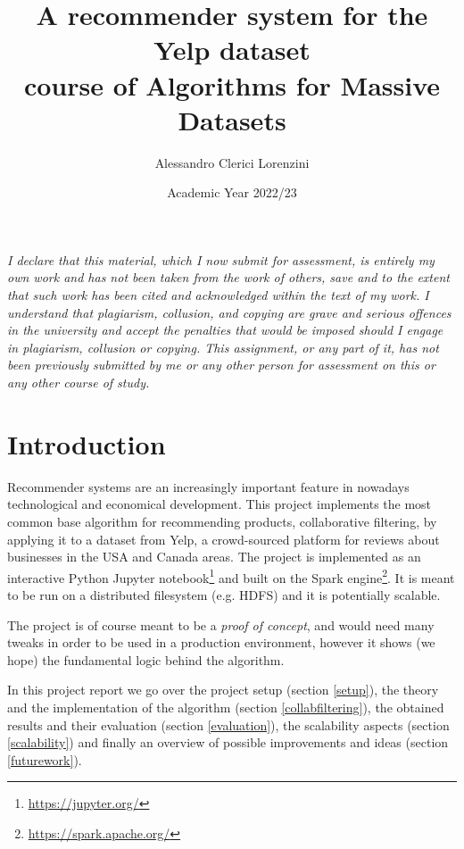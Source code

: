 \documentclass[11pt,a4paper]{article}
\title{A recommender system for the Yelp dataset\\
{\small course of Algorithms for Massive Datasets}}
\author{Alessandro Clerici Lorenzini}
\date{Academic Year 2022/23}
\begin{document}
\maketitle

\begin{multicols}{2}


\textit{I declare that this material, which I now submit for assessment, is entirely my own work and has not been taken from the work of others, save and to the extent that such work has been cited and acknowledged within the text of my work. I understand that plagiarism, collusion, and copying are grave and serious offences in the university and accept the penalties that would be imposed should I engage in plagiarism, collusion or copying. This assignment, or any part of it, has not been previously submitted by me or any other person for assessment on this or any other course of study.}



\section{Introduction}
Recommender systems are an increasingly important feature in nowadays technological and economical development.
This project implements the most common base algorithm for recommending products, collaborative filtering, by applying it to a dataset from Yelp, a crowd-sourced platform for reviews about businesses in the USA and Canada areas.
The project is implemented as an interactive Python Jupyter notebook\footnote{\url{https://jupyter.org/}} and built on the Spark engine\footnote{\url{https://spark.apache.org/}}.
It is meant to be run on a distributed filesystem (e.g. HDFS) and it is potentially scalable.

The project is of course meant to be a \emph{proof of concept}, and would need many tweaks in order to be used in a production environment, however it shows (we hope) the fundamental logic behind the algorithm.

In this project report we go over the project setup (section \ref{setup}), the theory and the implementation of the algorithm (section \ref{collabfiltering}), the obtained results and their evaluation (section \ref{evaluation}), the scalability aspects (section \ref{scalability}) and finally an overview of possible improvements and ideas (section \ref{futurework}).




\end{multicols}
\end{document}
